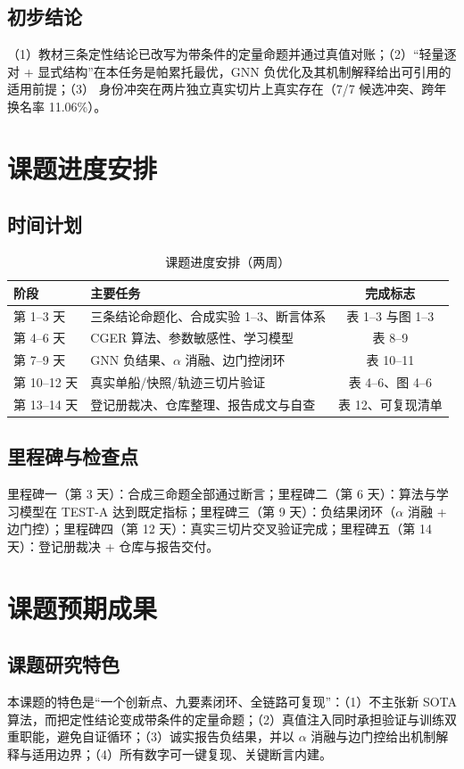 \documentclass[10.5pt,a4paper]{ctexart}
\newcommand{\mmsi}{\text{MMSI}}
\begin{document}
\subsection{初步结论}
（1）教材三条定性结论已改写为带条件的定量命题并通过真值对账；（2）``轻量逐对 + 显式结构''在本任务是帕累托最优，GNN 负优化及其机制解释给出可引用的适用前提；（3）\mmsi{} 身份冲突在两片独立真实切片上真实存在（7/7 候选冲突、跨年换名率 11.06\%）。

\section{课题进度安排}
\subsection{时间计划}
\begin{table}[htbp]\centering\small
\caption{课题进度安排（两周）}\label{tsched}
\begin{tabular}{@{}p{2.2cm}p{9.2cm}c@{}}
\toprule
阶段 & 主要任务 & 完成标志\\
\midrule
第 1--3 天 & 三条结论命题化、合成实验 1--3、断言体系 & 表 1--3 与图 1--3\\
第 4--6 天 & CGER 算法、参数敏感性、学习模型 & 表 8--9\\
第 7--9 天 & GNN 负结果、$\alpha$ 消融、边门控闭环 & 表 10--11\\
第 10--12 天 & 真实单船/快照/轨迹三切片验证 & 表 4--6、图 4--6\\
第 13--14 天 & 登记册裁决、仓库整理、报告成文与自查 & 表 12、可复现清单\\
\bottomrule
\end{tabular}
\end{table}

\subsection{里程碑与检查点}
里程碑一（第 3 天）：合成三命题全部通过断言；里程碑二（第 6 天）：算法与学习模型在 TEST-A 达到既定指标；里程碑三（第 9 天）：负结果闭环（$\alpha$ 消融 + 边门控）；里程碑四（第 12 天）：真实三切片交叉验证完成；里程碑五（第 14 天）：登记册裁决 + 仓库与报告交付。

\section{课题预期成果}
\subsection{课题研究特色}
本课题的特色是``一个创新点、九要素闭环、全链路可复现''：（1）不主张新 SOTA 算法，而把定性结论变成带条件的定量命题；（2）真值注入同时承担验证与训练双重职能，避免自证循环；（3）诚实报告负结果，并以 $\alpha$ 消融与边门控给出机制解释与适用边界；（4）所有数字可一键复现、关键断言内建。
\end{document}
